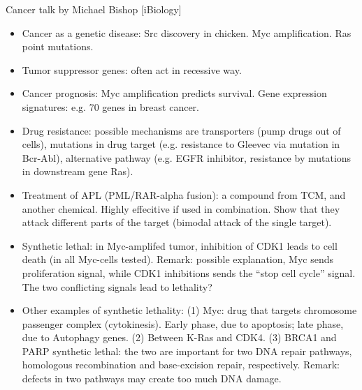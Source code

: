 \documentclass{report}
\begin{document}
Cancer talk by Michael Bishop [iBiology]
\begin{itemize}
	
	\item Cancer as a genetic disease: Src discovery in chicken. Myc amplification. Ras point mutations.
	
	\item Tumor suppressor genes: often act in recessive way.
	
	\item Cancer prognosis: Myc amplification predicts survival. Gene expression signatures: e.g. 70 genes in breast cancer.
	
	\item Drug resistance: possible mechanisms are transporters (pump drugs out of cells), mutations in drug target (e.g. resistance to Gleevec via mutation in Bcr-Abl), alternative pathway (e.g. EGFR inhibitor, resistance by mutations in downstream gene Ras).
	
	\item Treatment of APL (PML/RAR-alpha fusion): a compound from TCM, and another chemical. Highly effecitive if used in combination. Show that they attack different parts of the target (bimodal attack of the single target).
	
	\item Synthetic lethal: in Myc-amplifed tumor, inhibition of CDK1 leads to cell death (in all Myc-cells tested). Remark: possible explanation, Myc sends proliferation signal, while CDK1 inhibitions sends the “stop cell cycle” signal. The two conflicting signals lead to lethality?
	
	\item Other examples of synthetic lethality: (1) Myc: drug that targets chromosome passenger complex (cytokinesis). Early phase, due to apoptosis; late phase, due to Autophagy genes. (2) Between K-Ras and CDK4. (3) BRCA1 and PARP synthetic lethal: the two are important for two DNA repair pathways, homologous recombination and base-excision repair, respectively. Remark: defects in two pathways may create too much DNA damage.
\end{itemize}
\end{document}
